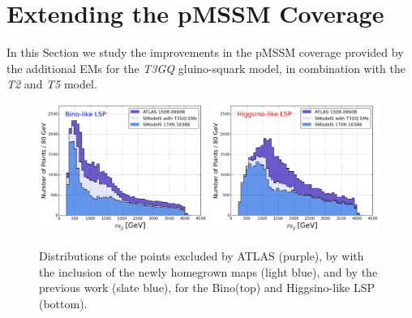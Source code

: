 \documentclass[epj,nopacs,fleqn]{svjour}
\begin{document}
\section{Extending the pMSSM Coverage}\label{sec::impact}
In this Section we study the improvements in the pMSSM coverage provided by the additional EMs for the \textit{T3GQ} gluino-squark model, in combination with the \textit{T2} and \textit{T5} model. 
\begin{figure}[!]
\begin{center}
\subfigure
{\includegraphics[width=0.49\textwidth]{PLOTS/New/Bino_Comparison_Gluino_aaa.png}}
\subfigure
{\includegraphics[width=0.49\textwidth]{PLOTS/New/Higgsino_Comparison_Gluino_aaa.png}}
\end{center}
\caption{Distributions of the points excluded by ATLAS (purple), by \SMO with the inclusion of the newly homegrown maps (light blue), and by the previous work \cite{Ambrogi:2017lov} (slate blue), for the Bino(top) and Higgsino-like LSP (bottom).}
\label{pmssm_new_exclusion_gluino}
\end{figure}
\\
\end{document}
